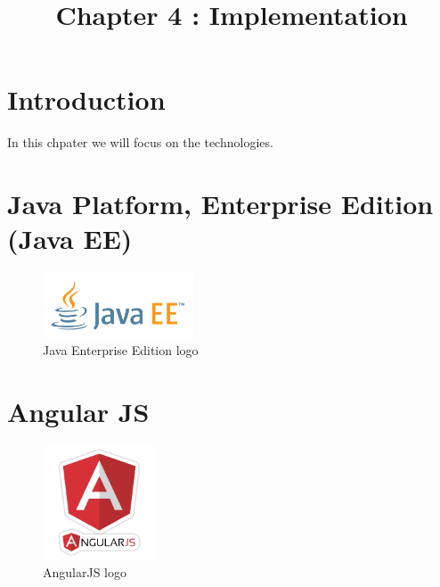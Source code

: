 \documentclass[12pt]{article}
\begin{document}
	\listoffigures
	
	\title{Chapter 4 : Implementation}
	\maketitle
	\section{Introduction}
	
	In this chpater we will focus on the technologies. 
	\section{Java Platform, Enterprise Edition (Java EE)}
	\begin{figure}[h]
		\centering
		\includegraphics[width=0.4\textwidth]{JAVAEE_logo.png}
		\caption{Java Enterprise Edition logo}
		
	\end{figure}
	\vspace{66mm}
	\section{Angular JS}
	\begin{figure}[h]
		\centering
		\includegraphics[width=0.3\textwidth]{AngularJS_logo.png}
		\caption{AngularJS logo}
	\end{figure}
\end{document}
